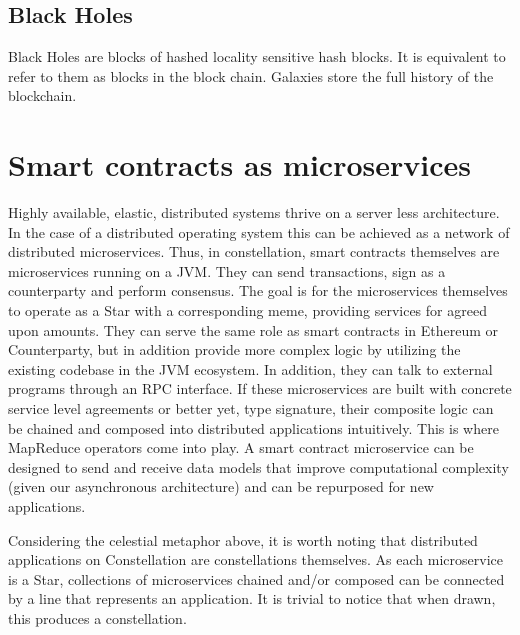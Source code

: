 \documentclass{article}
\begin{document}
\subsection{Black Holes}
Black Holes are blocks of hashed locality sensitive hash blocks. It is equivalent to refer to them as blocks in the block chain. Galaxies store the full history of the blockchain.

\section{Smart contracts as microservices}
Highly available, elastic, distributed systems thrive on a server less architecture. In the case of a distributed operating system this can be achieved as a network of distributed microservices. Thus, in constellation, smart contracts themselves are microservices running on a JVM. They can send transactions, sign as a counterparty and perform consensus. The goal is for the microservices themselves to operate as a Star with a corresponding meme, providing services for agreed upon amounts. They can serve the same role as smart contracts in Ethereum or Counterparty, but in addition provide more complex logic by utilizing the existing codebase in the JVM ecosystem. In addition, they can talk to external programs through an RPC interface. If these microservices are built with concrete service level agreements or better yet, type signature, their composite logic can be chained and composed into distributed applications intuitively. This is where MapReduce operators come into play. A smart contract microservice can be designed to send and receive data models that improve computational complexity (given our asynchronous architecture) and can be repurposed for new applications.

Considering the celestial metaphor above, it is worth noting that distributed applications on Constellation are constellations themselves. As each microservice is a  Star, collections of microservices chained and/or composed can be connected by a line that represents an application. It is trivial to notice that when drawn, this produces a constellation.
\end{document}
